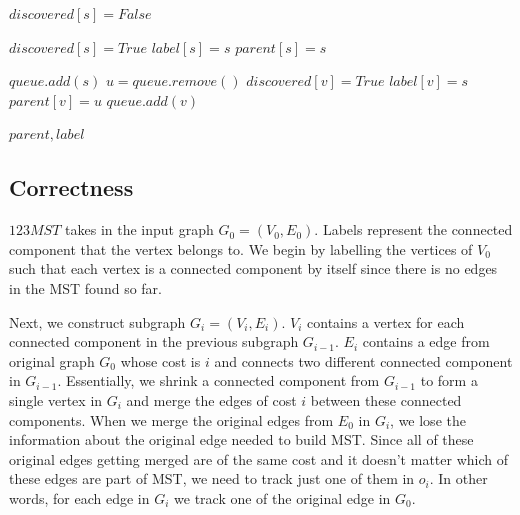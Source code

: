 \documentclass{article}
\begin{document}
\begin{algorithm}[H]
\begin{algorithmic}
                        \State $discovered[s] = False$
                    \EndFor

                            \State $discovered[s] = True$
                            \State $label[s] = s$
                            \State $parent[s] = s$

                            \State $queue.add(s)$
                                \State $u = queue.remove()$
                                        \State $discovered[v] = True$
                                        \State $label[v] = s$
                                        \State $parent[v] = u$
                                        \State $queue.add(v)$
                                    \EndIf
                                \EndFor
                            \EndWhile
                        \EndIf
                    \EndFor

                    \State \Return $parent, label$
                \EndProcedure
            \end{algorithmic}
        \end{algorithm}

    \subsection*{Correctness}
    $123MST$ takes in the input graph $G_0 = (V_0, E_0)$. Labels represent the connected component that the vertex belongs to. We begin by labelling the vertices of $V_0$ such that each vertex is a connected component by itself since there is no edges in the MST found so far.

    Next, we construct subgraph $G_i = (V_i, E_i)$. $V_i$ contains a vertex for each connected component in the previous subgraph $G_{i-1}$. $E_i$ contains a edge from original graph $G_0$ whose cost is $i$ and connects two different connected component in $G_{i-1}$. Essentially, we shrink a connected component from $G_{i-1}$ to form a single vertex in $G_i$ and merge the edges of cost $i$ between these connected components. When we merge the original edges from $E_0$ in $G_i$, we lose the information about the original edge needed to build MST. Since all of these original edges getting merged are of the same cost and it doesn't matter which of these edges are part of MST, we need to track just one of them in $o_i$. In other words, for each edge in $G_i$ we track one of the original edge in $G_0$.
    
\end{document}
